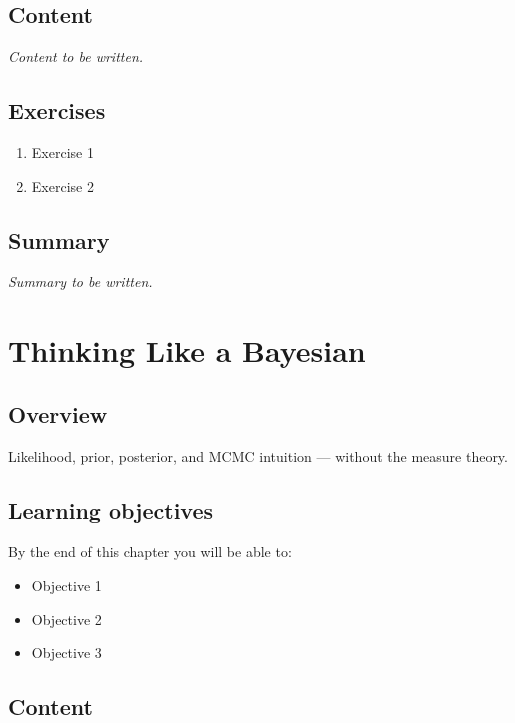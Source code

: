 \documentclass[
  11pt,
  a4paper,
  oneside,
  openany]{scrbook}
\providecommand{\tightlist}{%
  \setlength{\itemsep}{0pt}\setlength{\parskip}{0pt}}\usepackage{longtable,booktabs,array}
\begin{document}
\section{Content}\label{content}

\emph{Content to be written.}

\section{Exercises}\label{exercises-1}

\begin{enumerate}
\def\labelenumi{\arabic{enumi}.}
\tightlist
\item
  Exercise 1
\item
  Exercise 2
\end{enumerate}

\section{Summary}\label{summary-1}

\emph{Summary to be written.}

\chapter{Thinking Like a Bayesian}\label{thinking-like-a-bayesian}

\section{Overview}\label{overview-2}

Likelihood, prior, posterior, and MCMC intuition --- without the measure
theory.

\section{Learning objectives}\label{learning-objectives-2}

By the end of this chapter you will be able to:

\begin{itemize}
\tightlist
\item[$\square$]
  Objective 1
\item[$\square$]
  Objective 2
\item[$\square$]
  Objective 3
\end{itemize}

\section{Content}\label{content-1}
\end{document}

